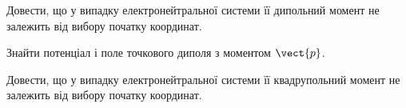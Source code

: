 \begin{problem}
Довести, що у випадку електронейтральної системи її дипольний момент не залежить від вибору початку координат.
\end{problem}

\begin{problem}
Знайти потенціал і поле точкового диполя з моментом $\vect{p}$.
\end{problem}

\begin{problem}
Довести, що у випадку електронейтральної системи її квадрупольний момент не залежить від вибору початку координат.
\end{problem}

